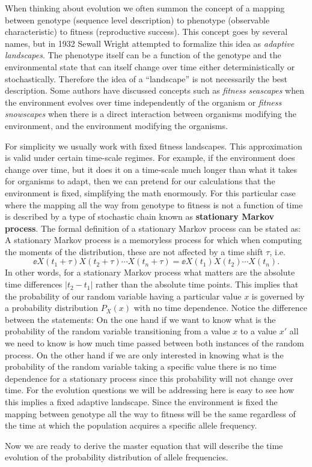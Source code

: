 When thinking about evolution we often summon the concept of a mapping between
genotype (sequence level description) to phenotype (observable characteristic)
to fitness (reproductive success). This concept goes by several names, but in
1932 Sewall Wright attempted to formalize this idea as \textit{adaptive
landscapes}. The phenotype itself can be a function of the genotype and the
environmental state that can itself change over time either deterministically
or stochastically. Therefore the idea of a ``landscape'' is not necessarily the
best description. Some authors have discussed concepts such as \textit{fitness
seascapes} when the environment evolves over time independently of the organism
or \textit{fitness snowscapes} when there is a direct interaction between
organisms modifying the environment, and the environment modifying the
organisms.

For simplicity we usually work with fixed fitness landscapes. This
approximation is valid under certain time-scale regimes. For example, if the
environment does change over time, but it does it on a time-scale much longer
than what it takes for organisms to adapt, then we can pretend for our
calculations that the environment is fixed, simplifying the math enormously.
For this particular case where the mapping all the way from genotype to fitness
is not a function of time is described by a type of stochastic chain known as
\textbf{stationary Markov process}. The formal definition of a stationary
Markov process can be stated as: A stationary Markov process is a memoryless
process for which when computing the moments of the distribution, these are not
affected by a time shift $\tau$, i.e.
\begin{equation}
  \ee{X(t_1 + \tau) X(t_2 + \tau) \cdots X(t_n + \tau)} =
  \ee{X(t_1) X(t_2) \cdots X(t_n)}.
\end{equation}
In other words, for a stationary Markov process what matters are the absolute
time differences $|t_2 - t_1|$ rather than the absolute time points. This
implies that the probability of our random variable having a particular value
$x$ is governed by a probability distribution $P_X(x)$ with no time dependence.
Notice the difference between the statements: On the one hand if we want to
know what is the probability of the random variable transitioning from a value
$x$ to a value $x'$ all we need to know is how much time passed between both
instances of the random process. On the other hand if we are only interested in
knowing what is the probability of the random variable taking a specific value
there is no time dependence for a stationary process since this probability
will not change over time. For the evolution questions we will be addressing
here is easy to see how this implies a fixed adaptive landscape. Since the
environment is fixed the mapping between genotype all the way to fitness will
be the same regardless of the time at which the population acquires a specific
allele frequency.

Now we are ready to derive the master equation that will describe the time
evolution of the probability distribution of allele frequencies.